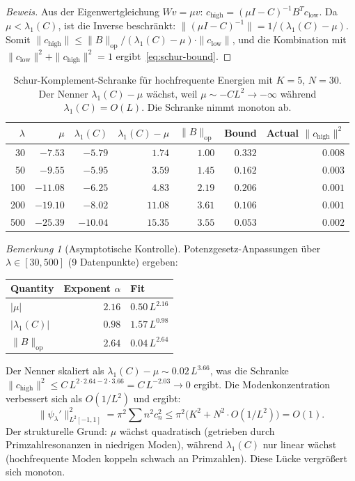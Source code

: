 \documentclass[12pt,a4paper]{article}
\theoremstyle{definition}
\theoremstyle{remark}
\newtheorem{remark}[theorem]{Bemerkung}
\begin{document}
\begin{proof}[Beweis]
Aus der Eigenwertgleichung $Wv = \mu v$:
$c_{\mathrm{high}} = (\mu I - C)^{-1} B^T c_{\mathrm{low}}$.
Da $\mu < \lambda_1(C)$, ist die Inverse beschränkt: $\|(\mu I - C)^{-1}\| = 1/(\lambda_1(C) - \mu)$.
Somit $\|c_{\mathrm{high}}\| \leq \|B\|_{\mathrm{op}} / (\lambda_1(C) - \mu) \cdot \|c_{\mathrm{low}}\|$,
und die Kombination mit $\|c_{\mathrm{low}}\|^2 + \|c_{\mathrm{high}}\|^2 = 1$ ergibt~\eqref{eq:schur-bound}.
\end{proof}

\begin{table}[h]
\centering
\small
\renewcommand{\arraystretch}{1.15}
\begin{tabular}{r|r|r|r|r|r|r}
$\lambda$ & $\mu$ & $\lambda_1(C)$ & $\lambda_1(C) - \mu$ & $\|B\|_{\mathrm{op}}$ & Bound & Actual $\|c_{\mathrm{high}}\|^2$ \\\hline
30  & $-7.53$  & $-5.79$ & $1.74$  & $1.00$ & $0.332$ & $0.008$ \\
50  & $-9.55$  & $-5.95$ & $3.59$  & $1.45$ & $0.162$ & $0.003$ \\
100 & $-11.08$ & $-6.25$ & $4.83$  & $2.19$ & $0.206$ & $0.001$ \\
200 & $-19.10$ & $-8.02$ & $11.08$ & $3.61$ & $0.106$ & $0.001$ \\
500 & $-25.39$ & $-10.04$ & $15.35$ & $3.55$ & $0.053$ & $0.002$
\end{tabular}
\caption{Schur-Komplement-Schranke für hochfrequente Energien mit $K = 5$, $N = 30$. Der Nenner $\lambda_1(C) - \mu$ wächst, weil $\mu \sim -CL^2 \to -\infty$ während $\lambda_1(C) = O(L)$. Die Schranke nimmt monoton ab.}
\label{tab:schur}
\end{table}

\begin{remark}[Asymptotische Kontrolle]
Potenzgesetz-Anpassungen über $\lambda \in [30, 500]$ (9 Datenpunkte) ergeben:
\begin{center}
\begin{tabular}{l|r|l}
Quantity & Exponent $\alpha$ & Fit \\\hline
$|\mu|$ & $2.16$ & $0.50\,L^{2.16}$ \\
$|\lambda_1(C)|$ & $0.98$ & $1.57\,L^{0.98}$ \\
$\|B\|_{\mathrm{op}}$ & $2.64$ & $0.04\,L^{2.64}$
\end{tabular}
\end{center}
Der Nenner skaliert als $\lambda_1(C) - \mu \sim 0.02\,L^{3.66}$, was die Schranke $\|c_{\mathrm{high}}\|^2 \leq C\,L^{2 \cdot 2.64 - 2 \cdot 3.66} = C\,L^{-2.03} \to 0$ ergibt. Die Modenkonzentration verbessert sich als $O(1/L^2)$ und ergibt:
\[
  \|\psi_\lambda'\|_{L^2[-1,1]}^2 = \pi^2 \sum n^2 c_n^2 \leq \pi^2\bigl(K^2 + N^2 \cdot O(1/L^2)\bigr) = O(1).
\]
Der strukturelle Grund: $\mu$ wächst quadratisch (getrieben durch Primzahlresonanzen in niedrigen Moden), während $\lambda_1(C)$ nur linear wächst (hochfrequente Moden koppeln schwach an Primzahlen). Diese Lücke vergrößert sich monoton.
\end{remark}
\end{document}
